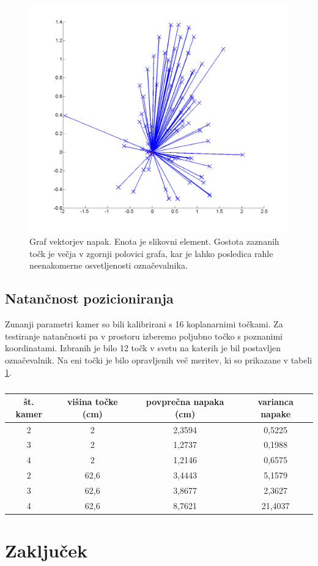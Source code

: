 \documentclass[a4paper, 12pt]{book}
\begin{document}
\begin{figure}[H]
\centering
\includegraphics[width=\textwidth,height=\textheight,keepaspectratio]{marker_detection_dynamic_errors.png}
\caption{Graf vektorjev napak. Enota je slikovni element. Gostota zaznanih točk je večja v zgornji polovici grafa, kar je lahko posledica rahle neenakomerne osvetljenosti označevalnika.}
\end{figure}

\section{Natančnost pozicioniranja}
Zunanji parametri kamer so bili kalibrirani s 16 koplanarnimi točkami. Za testiranje natančnosti pa v prostoru izberemo poljubno točko s poznanimi koordinatami. Izbranih je bilo 12 točk v svetu na katerih je bil postavljen označevalnik. Na eni točki je bilo opravljenih več meritev, ki so prikazane v tabeli \ref{positionerrortable}.
\begin{table}[H]
\centering
\begin{tabular}{| c | c | c | c |}
\hline
št. kamer & višina točke (cm) & povprečna napaka (cm) & varianca napake \\
\hline
2 & 2 & 2,3594 & 0,5225 \\
3 & 2 & 1,2737 & 0,1988 \\
4 & 2 & 1,2146 & 0,6575 \\

2 & 62,6 & 3,4443 & 5,1579 \\
3 & 62,6 & 3,8677 & 2,3627 \\
4 & 62,6 & 8,7621 & 21,4037 \\
\hline
\end{tabular}
\caption{}
\label{positionerrortable}
\end{table}


\chapter{Zaključek}

{}

\end{document}
